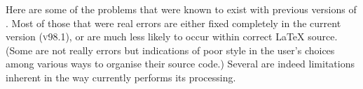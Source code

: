 \internal{}%
\startdocument
%
\label{sec:prb}%
\tableofchildlinks*\htmlrule{}\html{\\}%
\noindent
Here are some of the problems that were known to exist
with previous versions of \latextohtml.
Most of those that were real errors are either fixed completely
in the current version (\textsc{v98.1}), or are much less likely to occur
within correct \LaTeX{} source. (Some are not really errors but
indications of poor style in the user's choices among
various ways to organise their source code.)\html{\\}
Several are indeed limitations inherent in the way
\latextohtml{} currently performs its processing.
%
